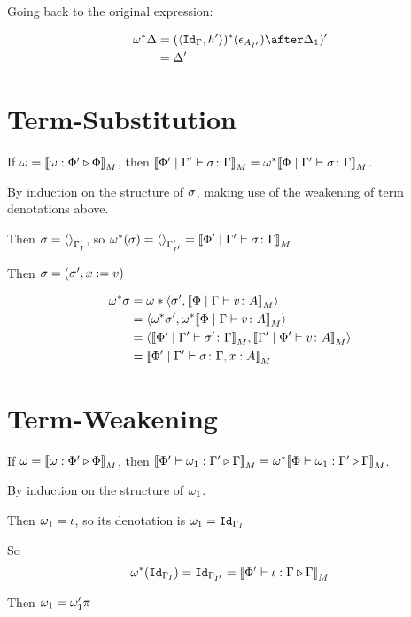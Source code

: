 \documentclass{report}
\begin{document}
Going back to the original expression:

\begin{align}
    \w\star{\D} & = (\pr{\Id{\G}}{h'})\star(\e_{A_{I'}})\after\D_1)'\\
    & = \D'\\
\end{align}



\section{Term-Substitution}

If $\omega = {\bf [\![}\omega : \Phi' \triangleright \Phi{\bf ]\!]}_M$, then ${\bf [\![}\Phi'\mid\Gamma' \vdash \sigma \colon \Gamma{\bf ]\!]}_M = \omega^*{\bf [\![}\Phi\mid\Gamma' \vdash \sigma \colon \Gamma{\bf ]\!]}_M$.

\proof
By induction on the structure of $\sigma$, making use of the weakening of term denotations above.

Then $\sigma = \left\langle\right\rangle_{\Gamma'_{I}}$, so $\omega^*(\sigma) = \left\langle\right\rangle_{\Gamma'_{I'}} = {\bf [\![}\Phi'\mid\Gamma' \vdash \sigma \colon \Gamma{\bf ]\!]}_M$

Then $\sigma = (\sigma',x:= v)$

\begin{align}
    \w\star\si & = \w*\pr{\si'}{\deno{\gpetyperelation{v}{A}}}\\
    & = \pr{\w\star\si'}{\w\star\deno{\gpetyperelation{v}{A}}}\\
    &=\pr{\deno{\etyperelation{\P'}{\G'}{\si'}{\G}}}{\deno{\etyperelation{\G'}{\P'}{v}{A}}}\\
    &=\deno{\etyperelation{\P'}{\G'}{\si}{\gax}}
\end{align}

\section{Term-Weakening}
If $\omega = {\bf [\![}\omega : \Phi' \triangleright \Phi{\bf ]\!]}_M$, then ${\bf [\![}\Phi'\vdash \omega_1 : \Gamma' \triangleright \Gamma{\bf ]\!]}_M = \omega^*{\bf [\![}\Phi\vdash \omega_1 : \Gamma' \triangleright \Gamma{\bf ]\!]}_M$.


\proof
By induction on the structure of $\omega_1$.

Then $\omega_1 = \iota$, so its denotation is $\omega_1 = \texttt{Id}_{\Gamma_I}$

So
\begin{equation}
  \omega^*(\texttt{Id}_{\Gamma_I}) = \texttt{Id}_{\Gamma_{I'}} = {\bf [\![}\Phi'\vdash \iota : \Gamma \triangleright \Gamma{\bf ]\!]}_M  
\end{equation}

Then $\omega_1 = \omega_1'\pi$
\end{document}
